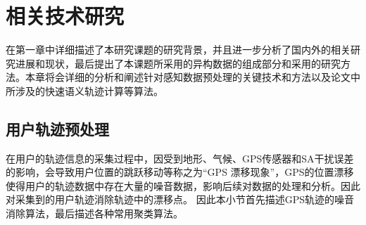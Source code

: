 \chapter{相关技术研究}
\label{chap:chapter02}
在第一章中详细描述了本研究课题的研究背景，并且进一步分析了国内外的相关研究进展和现状，最后提出了本课题所采用的异构数据的组成部分和采用的研究方法。本章将会详细的分析和阐述针对感知数据预处理的关键技术和方法以及论文中所涉及的快速语义轨迹计算等算法。
\section{用户轨迹预处理}
\label{sec:section2-1}
在用户的轨迹信息的采集过程中，因受到地形、气候、GPS传感器和SA干扰误差的影响，会导致用户位置的跳跃移动等称之为“GPS 漂移现象”，GPS的位置漂移使得用户的轨迹数据中存在大量的噪音数据，影响后续对数据的处理和分析。因此对采集到的用户轨迹消除轨迹中的漂移点。%
因此本小节首先描述GPS轨迹的噪音消除算法，最后描述各种常用聚类算法。
